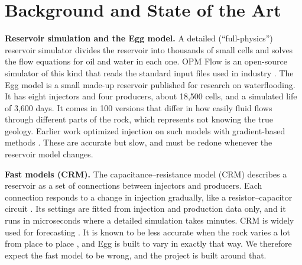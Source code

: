 \documentclass[11pt,letterpaper]{article}
\begin{document}



\section{Background and State of the Art}

\textbf{Reservoir simulation and the Egg model.} A detailed (``full-physics'') reservoir
simulator divides the reservoir into thousands of small cells and solves the flow equations
for oil and water in each one. OPM Flow is an open-source simulator of this kind that reads
the standard input files used in industry \cite{rasmussen2021opm}. The Egg model
\cite{jansen2014egg,egg2014dataset} is a small made-up reservoir published for research on
waterflooding. It has eight injectors and four producers, about 18,500 cells, and a
simulated life of 3,600 days. It comes in 100 versions that differ in how easily fluid
flows through different parts of the rock, which represents not knowing the true geology.
Earlier work optimized injection on such models with gradient-based methods
\cite{brouwer2004dynamic}. These are accurate but slow, and must be redone whenever the
reservoir model changes.

\textbf{Fast models (CRM).} The capacitance--resistance model (CRM) describes a reservoir
as a set of connections between injectors and producers. Each connection responds to a
change in injection gradually, like a resistor--capacitor circuit
\cite{yousef2006crm,sayarpour2009crm}. Its settings are fitted from injection and
production data only, and it runs in microseconds where a detailed simulation takes
minutes. CRM is widely used for forecasting \cite{soroush2018crmreview}. It is known to be
less accurate when the rock varies a lot from place to place \cite{mamghaderi2021crm}, and
Egg is built to vary in exactly that way. We therefore expect the fast model to be wrong,
and the project is built around that.
\end{document}
